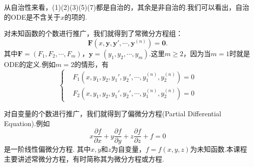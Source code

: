 从自治性来看，(1)(2)(3)(5)(7)都是自治的，其余是非自治的.我们可以看出，自治的ODE是不含关于$x$的项的.

对未知函数的个数进行推广，我们就得到了常微分方程组：
$$\mathbf{F}(x,\mathbf{y},\mathbf{y}',\cdots,\mathbf{y}^{(n)})=\mathbf{0}.$$
其中$\mathbf{F}=(F_1,F_2,\cdots,F_m)$，$\mathbf{y}=(y_1,y_2,\cdots,y_m)$.这里$m\geqslant 2$，因为当$m=1$时就是ODE的定义.例如$m=2$的情形，有
\begin{equation*}
	\left\{
	\begin{aligned}
		&F_1(x,y_1,y_2,y_1',y_2',\cdots,y_1^{(n)},y_2^{(n)})=0\\
		&F_2(x,y_1,y_2,y_1',y_2',\cdots,y_1^{(n)},y_2^{(n)})=0
	\end{aligned}
	\right.
\end{equation*}

对自变量的个数进行推广，我们就得到了{\heiti 偏微分方程}(Partial Differential Equation).例如
$$x\frac{\partial f}{\partial x}+y\frac{\partial f}{\partial y}+z\frac{\partial f}{\partial z}+f=0$$
是一阶线性偏微分方程. 其中$x,y$和$z$为自变量，$f=f(x,y,z)$为未知函数.本课程主要讲述常微分方程，有时简称其为微分方程或方程.

